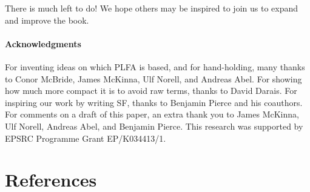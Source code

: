 \documentclass[preprint,authoryear]{elsarticle}
\begin{document}
There is much left to do!  We hope others may be inspired to join us
to expand and improve the book.

\paragraph{Acknowledgments}

For inventing ideas on which PLFA is based, and for hand-holding, many thanks to
Conor McBride, James McKinna, Ulf Norell, and Andreas Abel.  For showing how
much more compact it is to avoid raw terms, thanks to David Darais.  For
inspiring our work by writing SF, thanks to Benjamin Pierce and his coauthors.
For comments on a draft of this paper, an extra thank you to James McKinna, Ulf
Norell, Andreas Abel, and Benjamin Pierce. This research was supported by EPSRC
Programme Grant EP/K034413/1.


\section*{References}



\end{document}
